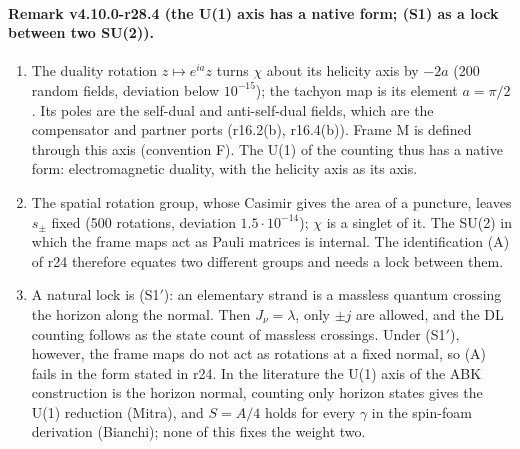 \paragraph{Remark v4.10.0-r28.4 (the U(1) axis has a native form; (S1) as a lock between two SU(2)).}
\begin{enumerate}[leftmargin=2em]
\item[(a)] The duality rotation \(z\mapsto e^{ia}z\) turns \(\chi\) about its helicity axis by \(-2a\) (200 random fields, deviation below
\(10^{-15}\)); the tachyon map is its element \(a=\pi/2\).  Its poles are the self-dual and anti-self-dual fields, which are the compensator
and partner ports (r16.2(b), r16.4(b)).  Frame M is defined through this axis (convention F).  The U(1) of the counting thus has a native
form: electromagnetic duality, with the helicity axis as its axis.
\item[(b)] The spatial rotation group, whose Casimir gives the area of a puncture, leaves \(s_\pm\) fixed (500 rotations, deviation
\(1.5\cdot10^{-14}\)); \(\chi\) is a singlet of it.  The SU(2) in which the frame maps act as Pauli matrices is internal.  The identification
(A) of r24 therefore equates two different groups and needs a lock between them.
\item[(c)] A natural lock is (S1\('\)): an elementary strand is a massless quantum crossing the horizon along the normal.  Then
\(J_\nu=\lambda\), only \(\pm j\) are allowed, and the DL counting follows as the state count of massless crossings.  Under (S1\('\)),
however, the frame maps do not act as rotations at a fixed normal, so (A) fails in the form stated in r24.  In the literature the U(1) axis
of the ABK construction is the horizon normal, counting only horizon states gives the U(1) reduction (Mitra), and \(S=A/4\) holds for every
\(\gamma\) in the spin-foam derivation (Bianchi); none of this fixes the weight two.
\end{enumerate}

